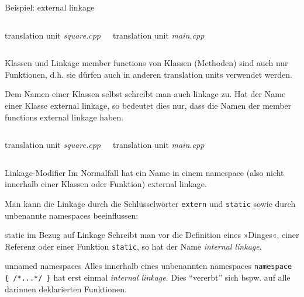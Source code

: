 \begin{frame}{Beispiel: external linkage}
	\footnotesize
	\begin{columns}[t]
		translation unit \emph{square.cpp}
		\vspace{1em}
		
		
		\pause
		
		translation unit \emph{main.cpp}
		\vspace{1em}
		
	\end{columns}
\end{frame}

\begin{frame}{Klassen und Linkage}
	member functions von Klassen (Methoden) sind auch nur Funktionen, d.h. sie dürfen auch in anderen translation units verwendet werden.
	
	Dem Namen einer Klassen selbst schreibt man auch linkage zu. Hat der Name einer Klasse external linkage, so bedeutet dies nur, dass die Namen der member functions external linkage haben.
	
	\pause
	\vspace{1em}
	
	\footnotesize
	\begin{columns}[t]
		translation unit \emph{square.cpp}
		\vspace{1em}
		
		
		\pause
		translation unit \emph{main.cpp}
		\vspace{1em}
		
	\end{columns}
\end{frame}

\begin{frame}[fragile]{Linkage-Modifier}
	Im Normalfall hat ein Name in einem namespace (also nicht innerhalb einer Klassen oder Funktion) external linkage.
	
	\vspace{1em}
	
	Man kann die Linkage durch die Schlüsselwörter \verb|extern| und \verb|static| sowie durch unbenannte namespaces beeinflussen:
	
	\pause
	
	\begin{block}{static im Bezug auf Linkage}
		Schreibt man vor die Definition eines »Dinges«, einer Referenz oder einer Funktion \verb|static|, so hat der Name \emph{internal linkage}.
	\end{block}
	
	\pause
	
	\begin{block}{unnamed namespaces}
		Alles innerhalb eines unbenannten namespaces \verb|namespace { /*...*/ }| hat erst einmal \emph{internal linkage}. Dies \enquote{vererbt} sich bspw. auf alle darinnen deklarierten Funktionen.
	\end{block}
\end{frame}

